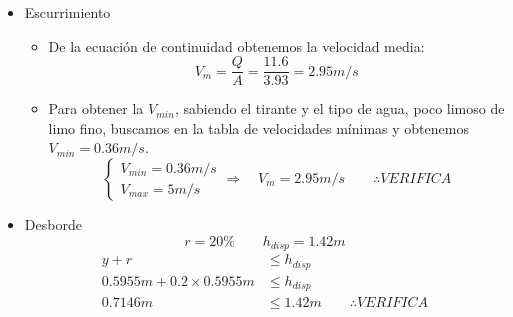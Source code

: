 \begin{itemize}

 \item Escurrimiento
    \begin{itemize}
    \item De la ecuación de continuidad obtenemos la velocidad media:
	\begin{equation*}
	V_{m} = \dfrac{Q}{A} = \dfrac{11.6}{3.93} = 2.95 m/s
	\end{equation*}
    \item Para obtener la $V_{min}$, sabiendo el tirante y el tipo de agua, poco limoso de limo fino, buscamos en
    la tabla de velocidades mínimas y obtenemos $V_{min} = 0.36 m/s$.
	\begin{equation*}
	  \begin{cases}
	  V_{min} = 0.36 m/s \\
	  V_{max} = 5 m/s
	  \end{cases}
	  \Longrightarrow \quad
	  V_{m} = 2.95 m/s
	  \qquad
	  \therefore VERIFICA
	\end{equation*}
    \end{itemize}

 \item Desborde
    \begin{equation*}
    r = 20\%
    \qquad
    h_{disp} = 1.42 m
    \end{equation*}
    \begin{align*}
    y + r &\leq h_{disp} \\
    0.5955 m + 0.2 \times 0.5955 m &\leq h_{disp} \\
    0.7146 m &\leq 1.42 m
    \qquad
    \therefore VERIFICA
    \end{align*}

\end{itemize}
